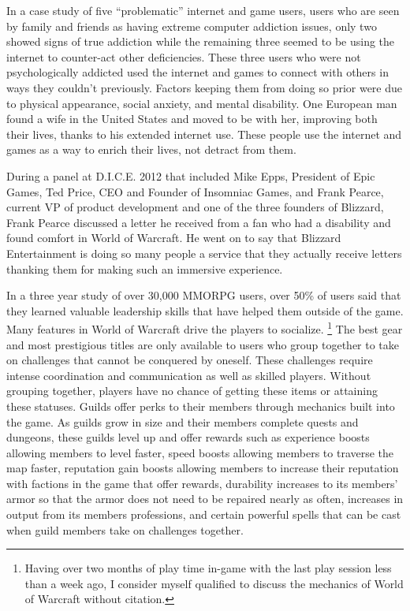\documentclass[11pt]{article}
\begin{document}
\begin{multicols}{2}
In a case study of five ``problematic'' internet and game users, users who are seen by family and friends as having extreme computer addiction issues, only two showed signs of true addiction while the remaining three seemed to be using the internet to counter-act other deficiencies. \cite{IsThereEvidenceOfInternetAddiction} These three users who were not psychologically addicted used the internet and games to connect with others in ways they couldn't previously. Factors keeping them from doing so prior were due to physical appearance, social anxiety, and mental disability. One European man found a wife in the United States and moved to be with her, improving both their lives, thanks to his extended internet use. \cite{IsThereEvidenceOfInternetAddiction} These people use the internet and games as a way to enrich their lives, not detract from them.

During a panel at D.I.C.E. 2012 \cite{DICEInterview} that included Mike Epps, President of Epic Games, Ted Price, CEO and Founder of Insomniac Games, and Frank Pearce, current VP of product development and one of the three founders of Blizzard, Frank Pearce discussed a letter he received from a fan who had a disability and found comfort in World of Warcraft. He went on to say that Blizzard Entertainment is doing so many people a service that they actually receive letters thanking them for making such an immersive experience. \cite{DICEInterview}

In a three year study of over 30,000 MMORPG users, over 50\% of users said that they learned valuable leadership skills that have helped them outside of the game. \cite{MotivationsAndDerviedExperiences}
Many features in World of Warcraft drive the players to socialize. \footnote{Having over two months of play time in-game with the last play session less than a week ago, I consider myself qualified to discuss the mechanics of World of Warcraft without citation.} The best gear and most prestigious titles are only available to users who group together to take on challenges that cannot be conquered by oneself. These challenges require intense coordination and communication as well as skilled players. Without grouping together, players have no chance of getting these items or attaining these statuses.
Guilds offer perks to their members through mechanics built into the game. As guilds grow in size and their members complete quests and dungeons, these guilds level up and offer rewards such as experience boosts allowing members to level faster, speed boosts allowing members to traverse the map faster, reputation gain boosts allowing members to increase their reputation with factions in the game that offer rewards, durability increases to its members' armor so that the armor does not need to be repaired nearly as often, increases in output from its members professions, and certain powerful spells that can be cast when guild members take on challenges together.


\end{multicols}
\end{document}
